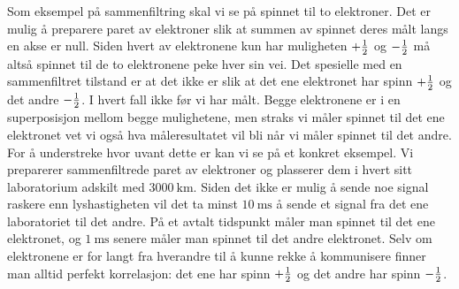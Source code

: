 Som eksempel på sammenfiltring skal vi se på spinnet til to elektroner. Det er mulig å preparere paret av elektroner slik at summen av spinnet deres målt langs en akse er null. Siden hvert av elektronene kun har muligheten $+\frac{1}{2}$ og $-\frac{1}{2}$ må altså spinnet til de to elektronene peke hver sin vei. Det spesielle med en sammenfiltret tilstand er at det ikke er slik at det ene elektronet har spinn $+\frac{1}{2}$ og det andre $-\frac{1}{2}$. I hvert fall ikke før vi har målt. Begge elektronene er i en superposisjon mellom begge mulighetene, men straks vi måler spinnet til det ene elektronet vet vi også hva måleresultatet vil bli når vi måler spinnet til det andre. For å understreke hvor uvant dette er kan vi se på et konkret eksempel. Vi preparerer sammenfiltrede paret av elektroner og plasserer dem i hvert sitt laboratorium adskilt med $3000~\mathrm{km}$. Siden det ikke er mulig å sende noe signal raskere enn lyshastigheten vil det ta minst $10~\mathrm{ms}$ å sende et signal fra det ene laboratoriet til det andre. På et avtalt tidspunkt måler man spinnet til det ene elektronet, og $1~\mathrm{ms}$ senere måler man spinnet til det andre elektronet. Selv om elektronene er for langt fra hverandre til å kunne rekke å kommunisere finner man alltid perfekt korrelasjon: det ene har spinn $+\frac{1}{2}$ og det andre har spinn $-\frac{1}{2}$. 

